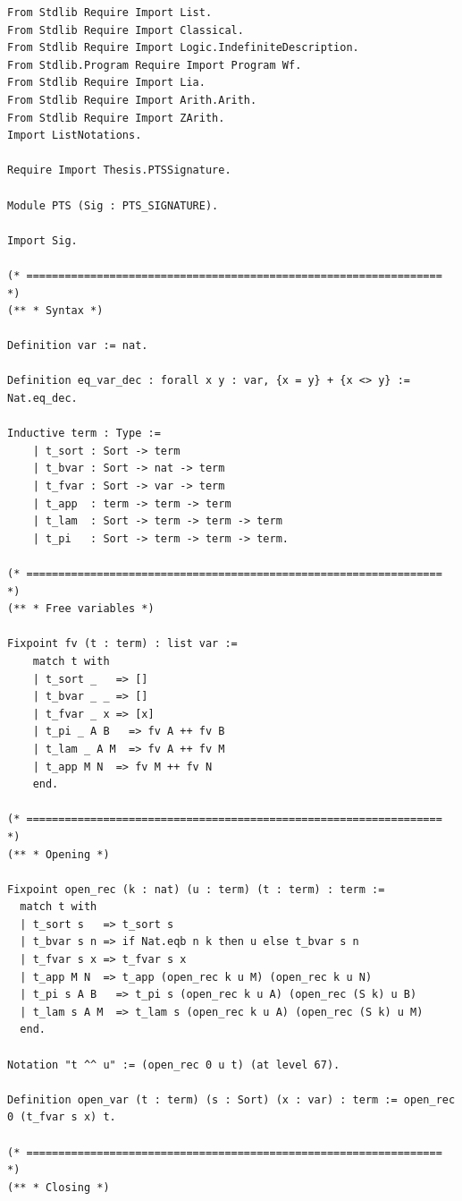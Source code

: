 \begin{latin}
\setmonofont{DejaVu Sans Mono}
\begin{verbatim}
From Stdlib Require Import List.
From Stdlib Require Import Classical.
From Stdlib Require Import Logic.IndefiniteDescription.
From Stdlib.Program Require Import Program Wf.
From Stdlib Require Import Lia.
From Stdlib Require Import Arith.Arith.
From Stdlib Require Import ZArith.
Import ListNotations.

Require Import Thesis.PTSSignature.

Module PTS (Sig : PTS_SIGNATURE).

Import Sig.

(* ================================================================= *)
(** * Syntax *)

Definition var := nat.

Definition eq_var_dec : forall x y : var, {x = y} + {x <> y} := Nat.eq_dec.

Inductive term : Type :=
    | t_sort : Sort -> term
    | t_bvar : Sort -> nat -> term
    | t_fvar : Sort -> var -> term
    | t_app  : term -> term -> term
    | t_lam  : Sort -> term -> term -> term
    | t_pi   : Sort -> term -> term -> term.

(* ================================================================= *)
(** * Free variables *)

Fixpoint fv (t : term) : list var :=
    match t with
    | t_sort _   => []
    | t_bvar _ _ => []
    | t_fvar _ x => [x]
    | t_pi _ A B   => fv A ++ fv B
    | t_lam _ A M  => fv A ++ fv M
    | t_app M N  => fv M ++ fv N
    end.

(* ================================================================= *)
(** * Opening *)

Fixpoint open_rec (k : nat) (u : term) (t : term) : term :=
  match t with
  | t_sort s   => t_sort s
  | t_bvar s n => if Nat.eqb n k then u else t_bvar s n
  | t_fvar s x => t_fvar s x
  | t_app M N  => t_app (open_rec k u M) (open_rec k u N)
  | t_pi s A B   => t_pi s (open_rec k u A) (open_rec (S k) u B)
  | t_lam s A M  => t_lam s (open_rec k u A) (open_rec (S k) u M)
  end.

Notation "t ^^ u" := (open_rec 0 u t) (at level 67).

Definition open_var (t : term) (s : Sort) (x : var) : term := open_rec 0 (t_fvar s x) t.

(* ================================================================= *)
(** * Closing *)


\end{verbatim}
\end{latin}
